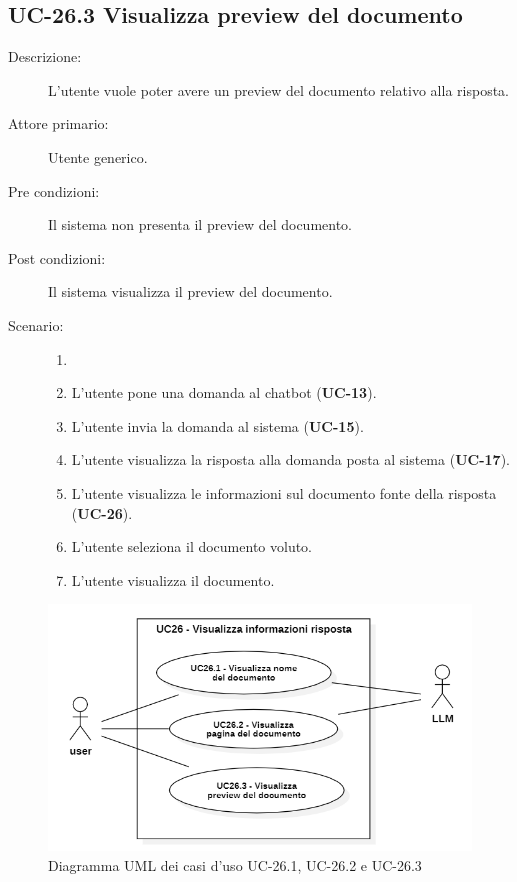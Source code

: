 \subsection{UC-26.3 Visualizza preview del documento}
\begin{description}
    \item[Descrizione:] L'utente vuole poter avere un preview del documento relativo alla risposta.
    \item[Attore primario:] Utente generico.
    \item[Pre condizioni:] Il sistema non presenta il preview del documento.
    \item[Post condizioni:] Il sistema visualizza il preview del documento.
    \item[Scenario:] 
    \begin{enumerate}
        \item[]
        \item L’utente pone una domanda al chatbot (\textbf{UC-13}).
        \item L'utente invia la domanda al sistema (\textbf{UC-15}).
        \item L'utente visualizza la risposta alla domanda posta al sistema (\textbf{UC-17}).
        \item L'utente visualizza le informazioni sul documento fonte della risposta (\textbf{UC-26}).
        \item L'utente seleziona il documento voluto. 
        \item L'utente visualizza il documento.
    \end{enumerate}
\end{description}

\begin{figure}[H]
    \centering
    \includegraphics[width=0.9\linewidth]{UC26.1-2-3.png} %
    \caption{Diagramma UML dei casi d'uso UC-26.1, UC-26.2 e UC-26.3}
    \label{fig:UC32.1-2-3}
\end{figure}

